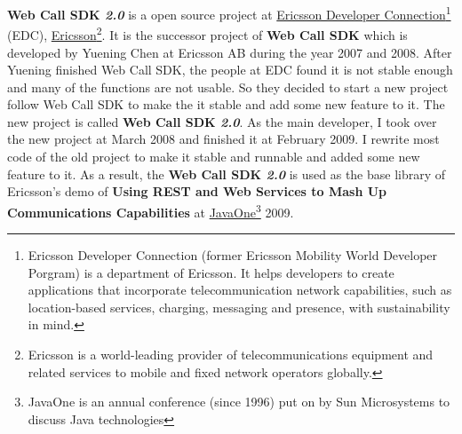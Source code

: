\textbf{Web Call SDK \textit{2.0}} is a open source project at \href{http://www.ericsson.com/developer/}{Ericsson Developer Connection}\footnote{Ericsson Developer Connection (former Ericsson Mobility World Developer Porgram) is a department of Ericsson. It helps developers to create applications that incorporate telecommunication network capabilities, such as location-based services, charging, messaging and presence, with sustainability in mind.} (EDC), \href{http://www.ericsson.com/}{Ericsson}\footnote{Ericsson is a world-leading provider of telecommunications equipment and related services to mobile and fixed network operators globally.}. It is the successor project of \textbf{Web Call SDK}\cite{WebCallSDK} which is developed by Yuening Chen at Ericsson AB during the year 2007 and 2008. After Yuening finished Web Call SDK, the people at EDC found it is not stable enough and many of the functions are not usable. So they decided to start a new project follow Web Call SDK to make the it stable and add some new feature to it. The new project is called \textbf{Web Call SDK \textit{2.0}}. As the main developer, I took over the new project at March 2008 and finished it at February 2009. I rewrite most code of the old project to make it stable and runnable and added some new feature to it. As a result, the \textbf{Web Call SDK \textit{2.0}} is used as the base library of Ericsson's demo of \textbf{Using REST and Web Services to Mash Up Communications Capabilities}\cite{DemoAtJavaOne}\cite{EricssonJavaOne} at \href{http://java.sun.com/javaone/}{JavaOne}\texttrademark\footnote{JavaOne is an annual conference (since 1996) put on by Sun Microsystems to discuss Java technologies} 2009.
